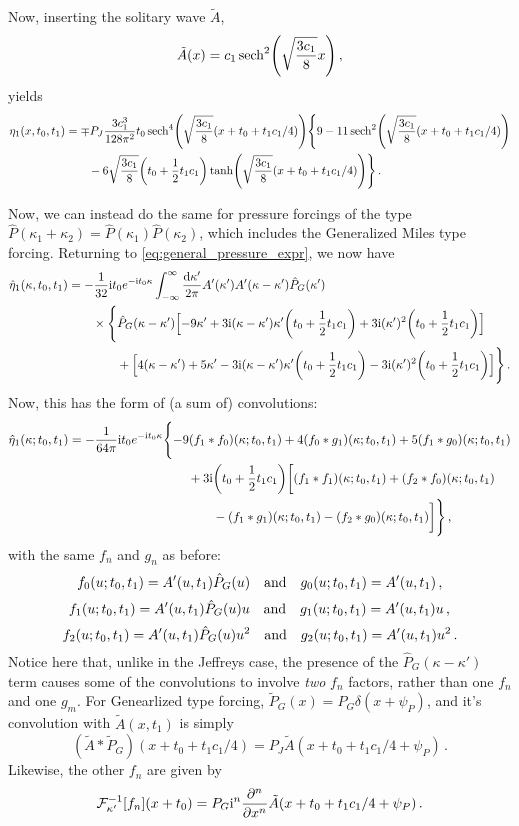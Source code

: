 \documentclass{jfm}
\newcommand{\im}{\mathrm{i}}
\begin{document}
Now, inserting the solitary wave $\tilde{A}$,
\[
  \tilde{A}(x) = c_1 \sech[2](\sqrt{\frac{3 c_1}{8}} x) \,,
\]
yields
\begin{align*}
  \eta_1(x,t_0,t_1) &=
  \mp P_J \frac{3 c_1^3}{128 \pi^2} t_0 \sech[4](\sqrt{\frac{3 c_1}{8}}
  (x+t_0 + t_1 c_1/4))
  \Biggl\{
    9-11\sech[2](\sqrt{\frac{3 c_1}{8}} (x+t_0 + t_1 c_1/4)) \\
  &\qquad - 6 \sqrt{\frac{3 c_1}{8}}
    \pqty{t_0+\frac{1}{2} t_1 c_1} \tanh(\sqrt{\frac{3 c_1}{8}} (x+t_0 + t_1 c_1/4))
  \Biggr\}
 \,.
\end{align*}

Now, we can instead do the same for pressure forcings of the type
$\hat{P}(\kappa_1+\kappa_2) = \hat{P}(\kappa_1) \hat{P}(\kappa_2)$,
which includes the Generalized Miles type forcing.
Returning to \cref{eq:general_pressure_expr}, we now have
\begin{align*}
  \hat{\eta}_1(\kappa,t_0,t_1) &=
  -\frac{1}{32} \im t_0 e^{-\im t_0 \kappa}
  \int_{-\infty}^{\infty} \frac{\dd{\kappa'}}{2\pi} A'(\kappa')
  A'(\kappa-\kappa') \hat{P}_G(\kappa')
  \\ &\qquad
  \times \Biggl\{
    \hat{P}_G(\kappa-\kappa')
    \Bigl[-9 \kappa' + 3 \im (\kappa - \kappa') \kappa' \pqty{t_0 +
      \frac{1}{2} t_1 c_1}
    + 3 \im (\kappa')^2 \pqty{t_0 + \frac{1}{2} t_1 c_1} \Bigr] \\
  &\qquad\qquad
    +
    \Bigl[4 (\kappa-\kappa') + 5\kappa'
    -3 \im (\kappa - \kappa') \kappa' \pqty{t_0 + \frac{1}{2} t_1 c_1}
    -3 \im (\kappa')^2 \pqty{t_0 + \frac{1}{2} t_1 c_1}\Bigr]
  \Biggr\}
  \,.
\end{align*}
Now, this has the form of (a sum of) convolutions:
\begin{align*}
  \hat{\eta}_1(\kappa;t_0,t_1) = -\frac{1}{64\pi} \im t_0 e^{-\im t_0
    \kappa} & \Biggl\{
    -9 (f_1 * f_0)(\kappa; t_0,t_1)
    +4 (f_0 * g_1)(\kappa; t_0,t_1)
    +5 (f_1 * g_0)(\kappa; t_0,t_1) \\
    &\qquad 
    + 3 \im \pqty{t_0 + \frac{1}{2} t_1 c_1} \biggl[
      (f_1 * f_1)(\kappa; t_0,t_1)
      + (f_2 * f_0)(\kappa; t_0,t_1) \\
    &\qquad\qquad
      - (f_1 * g_1)(\kappa; t_0,t_1)
      - (f_2 * g_0)(\kappa; t_0,t_1)
    \biggr] \Biggr\} \,,
\end{align*}
with the same $f_n$ and $g_n$ as before:
\[
  f_0(u;t_0,t_1) = A'(u,t_1) \hat{P}_G(u) \qq{and}
  g_0(u;t_0,t_1) = A'(u,t_1) \,,
\]
\[
  f_1(u;t_0,t_1) = A'(u,t_1) \hat{P}_G(u) u \qq{and}
  g_1(u;t_0,t_1) = A'(u,t_1) u \,,
\]
\[
  f_2(u;t_0,t_1) = A'(u,t_1) \hat{P}_G(u) u^2 \qq{and}
  g_2(u;t_0,t_1) = A'(u,t_1) u^2 \,.
\]
Notice here that, unlike in the Jeffreys case, the presence of the
$\hat{P}_G(\kappa-\kappa')$ term causes some of the convolutions to
involve \emph{two} $f_n$ factors, rather than one $f_n$ and one $g_m$.
For Genearlized type forcing, $\tilde{P}_G(x) = P_G \delta(x+\psi_P)$, and it's
convolution with $\tilde{A}(x,t_1)$ is simply
\[
  (\tilde{A} * \tilde{P}_G)(x+t_0+t_1 c_1/4) = P_J
  \tilde{A}(x+t_0+t_1 c_1/4+\psi_P) \,.
\]
Likewise, the other $f_n$ are given by
\[
  \mathcal{F}^{-1}_{\kappa'}[f_n](x+t_0) = P_G \im^n \pdv[n]{x}
    \tilde{A}(x+t_0+t_1 c_1/4+\psi_P) \,.
\]
\end{document}

